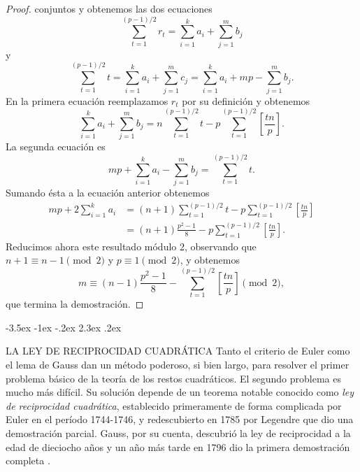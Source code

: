 \documentclass[12pt,a4paper]{book}
\makeatletter
\renewcommand\section{\@startsection{section}{1}{\z@}%
  {-3.5ex \@plus -1ex \@minus -.2ex}%
  {2.3ex \@plus .2ex}%
  {\normalfont\Large\bfseries\raggedright}}
\makeatother
\begin{document}
\begin{proof}
        conjuntos y obtenemos las dos ecuaciones
        \begin{equation*}
            \sum_{t=1}^{(p-1)/2}r_{t}=\sum_{i=1}^{k}a_{i}+\sum_{j=1}^{m}b_{j}
        \end{equation*}
        y
        \begin{equation*}
            \sum_{t=1}^{(p-1)/2}t=\sum_{i=1}^{k}a_{i}+\sum_{j=1}^{m}c_{j}=\sum_{i=1}^{k}a_{i}+mp-\sum_{j=1}^{m}b_{j}.
        \end{equation*}
        En la primera ecuación reemplazamos $r_{t}$ por su definición y obtenemos
        \begin{equation*}
            \sum_{i=1}^{k}a_{i}+\sum_{j=1}^{m}b_{j}=n\sum_{t=1}^{(p-1)/2}t-p\sum_{t=1}^{(p-1)/2}\left[\frac{tn}{p}\right].
        \end{equation*}
        La segunda ecuación es
        \begin{equation*}
            mp+\sum_{i=1}^{k}a_{i}-\sum_{j=1}^{m}b_{j}=\sum_{t=1}^{(p-1)/2}t.
        \end{equation*}
        Sumando ésta a la ecuación anterior obtenemos
        \begin{align*}
            mp+2\sum_{i=1}^{k}a_{i}&=(n+1)\sum_{t=1}^{(p-1)/2}t-p\sum_{t=1}^{(p-1)/2}\left[\frac{tn}{p}\right]\\
            &=(n+1)\frac{p^{2}-1}{8}-p\sum_{t=1}^{(p-1)/2}\left[\frac{tn}{p}\right].
        \end{align*}
        Reducimos ahora este resultado módulo 2, observando que $n+1\equiv n-1\pmod{2}$ y
        $p\equiv1\pmod{2}$, y obtenemos
        \begin{equation*}
            m\equiv(n-1)\frac{p^{2}-1}{8}-\sum_{t=1}^{(p-1)/2}\left[\frac{tn}{p}\right]\pmod{2},
        \end{equation*}
        que termina la demostración.
    \end{proof}

    \section{LA LEY DE RECIPROCIDAD CUADRÁTICA}
    Tanto el criterio de Euler como el lema de Gauss dan un método poderoso, si bien
    largo, para resolver el primer problema básico de la teoría de los restos cuadráticos.
    El segundo problema es mucho más difícil. Su solución depende de un teorema notable
    conocido como \textit{ley de reciprocidad cuadrática}, establecido primeramente de
    forma complicada por Euler en el período 1744-1746, y redescubierto en 1785 por
    Legendre \cite{legendre1798} que dio una demostración parcial. Gauss, por su cuenta, descubrió la ley de
    reciprocidad a la edad de dieciocho años y un año más tarde en 1796 dio la primera
    demostración completa \cite{gauss1801}.
\end{document}
